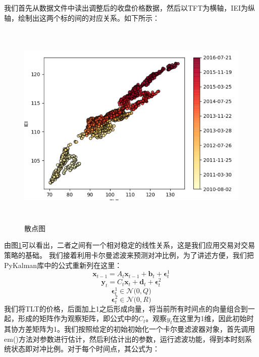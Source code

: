 我们首先从数据文件中读出调整后的收盘价格数据，然后以TFT为横轴，IEI为纵轴，绘制出这两个标的间的对应关系。如下所示：
\begin{figure}[H]
	\caption{散点图}
	\label{f000056}
	\centering
	\includegraphics[height=10cm]{images/f000056}
\end{figure}
由图\ref{f000056}可以看出，二者之间有一个相对稳定的线性关系，这是我们应用交易对交易策略的基础。\newline
我们接着利用卡尔曼滤波来预测对冲比例，为了讲述方便，我们把PyKalman库中的公式重新列在这里：
\begin{equation}
\boldsymbol{x}_{t-1}=A_{t}\boldsymbol{x}_{t-1} + \boldsymbol{b}_{t} + \boldsymbol{\epsilon}_{t}^{1}
\label{e000077}
\end{equation}
\begin{equation}
\boldsymbol{y}_{t}=C_{t}\boldsymbol{x}_{t} + \boldsymbol{d}_{t} + \boldsymbol{\epsilon}_{t}^{2}
\label{e000078}
\end{equation}
\begin{equation}
\boldsymbol{\epsilon}_{t}^{1} \in \mathcal{N} \big( 0, Q \big)
\label{e000079}
\end{equation}
\begin{equation}
\boldsymbol{\epsilon}_{t}^{2} \in \mathcal{N} \big( 0, R \big)
\label{e000080}
\end{equation}
我们将TLT的价格，后面加上1之后形成向量，将当前所有时间点的向量组合到一起，形成的矩阵作为观察矩阵，即公式中的$C_{t}$。观察$y_{t}$在这里为1维，因此初始时其协方差矩阵为1。我们按照给定的初始初始化一个卡尔曼滤波器对象，首先调用em()方法对参数进行估计，然后利估计出的参数，运行滤波功能，得到本时刻系统状态即对冲比例。对于每个时间点，其公式为：
